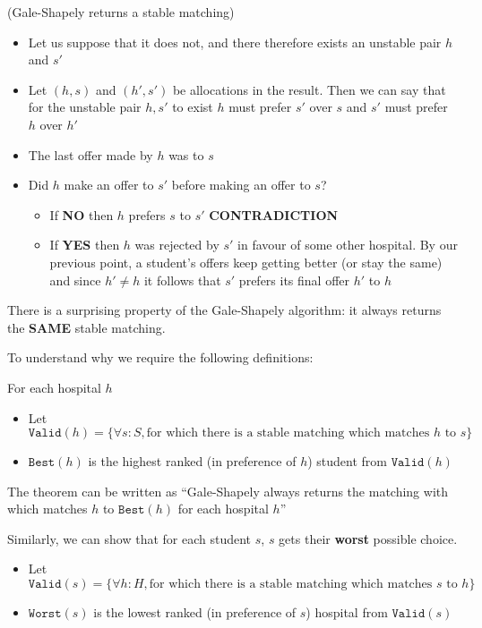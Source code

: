 \documentclass{article}
\begin{document}
\begin{theorem}(Gale-Shapely returns a stable matching)
    \begin{itemize}
        \item Let us suppose that it does not, and there therefore exists an unstable pair $h$ and $s'$
        \item Let $(h,s)$ and $(h',s')$ be allocations in the result. Then we can say that for the unstable pair $h,s'$ to exist $h$ must prefer $s'$ over $s$ and $s'$ must prefer $h$ over $h'$
        \item The last offer made by $h$ was to $s$
        \item Did $h$ make an offer to $s'$ before making an offer to $s$?
        \begin{itemize}
            \item If \textbf{NO} then $h$ prefers $s$ to $s'$ \textbf{CONTRADICTION}
            \item If \textbf{YES} then $h$ was rejected by $s'$ in favour of some other hospital. By our previous point, a student's offers keep getting better (or stay the same) and since $h' \neq h$ it follows that $s'$ prefers its final offer $h'$ to $h$
        \end{itemize}
    \end{itemize}
  \end{theorem}

  There is a surprising property of the Gale-Shapely algorithm: it always returns the \textbf{SAME} stable matching.

  To understand why we require the following definitions:

  For each hospital $h$
  \begin{itemize}
    \item  Let $\texttt{Valid}(h) = \{\forall  s : S,  \text{for which there is a stable matching which matches $h$ to $s$}  \}  $
    \item  $\texttt{Best}(h) $ is the highest ranked (in preference of $h$) student from $\texttt{Valid}(h) $
  \end{itemize}

  The theorem can be written as ``Gale-Shapely always returns the matching with which matches $h$ to $\texttt{Best}(h) $ for each hospital $h$''

  Similarly, we can show that for each student $s$, $s$ gets their \textbf{worst} possible choice.

  \begin{itemize}
    \item Let $\texttt{Valid}(s) = \{ \forall h : H, \text{for which there is a stable matching which matches $s$ to $h$} \}  $
    \item $\texttt{Worst}(s) $ is the lowest ranked (in preference of $s$) hospital from $\texttt{Valid}(s) $
  \end{itemize}
\end{document}
